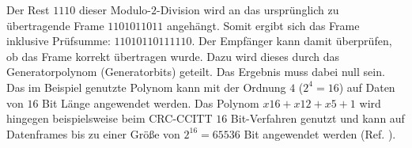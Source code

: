 Der Rest $1110$ dieser Modulo-$2$-Division wird an das
urspr{\"u}nglich zu {\"u}bertragende Frame $11 0101 1011$ angeh{\"a}ngt. Somit
ergibt sich das Frame inklusive Pr{\"u}fsumme: $11 0101 1011 1110$. Der
Empf{\"a}nger kann damit {\"u}berpr{\"u}fen, ob das Frame korrekt {\"u}bertragen
wurde. Dazu wird dieses durch das Generatorpolynom (Generatorbits) geteilt.
Das Ergebnis muss dabei null sein. Das im Beispiel genutzte Polynom kann mit der
Ordnung $4$ ($2^4=16$) auf Daten von $16$ Bit Länge angewendet werden. Das
Polynom $x16+x12+x5+1$ wird hingegen beispielsweise beim CRC-CCITT $16$ Bit-Verfahren
genutzt und kann auf Datenframes bis zu einer Gr{\"o}{\ss}e von $2^{16}=65536$
Bit angewendet werden (Ref. \cite{web2}).

